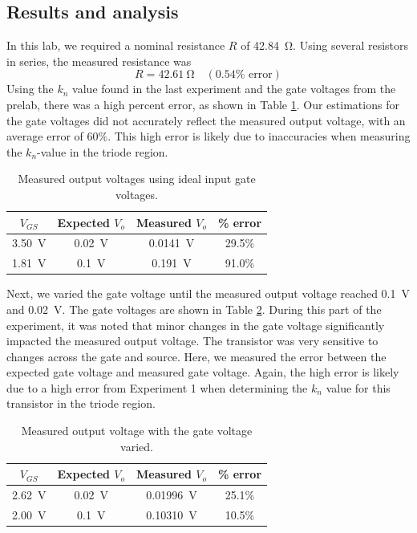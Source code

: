 \documentclass{report}
\begin{document}
\subsection{Results and analysis}
In this lab, we required a nominal resistance $R$ of \SI{42.84}{\ohm}. Using several resistors in series, the measured resistance was
\[ R = \SI{42.61}{\ohm} \quad (0.54\% \text{ error})\]
Using the $k_n$ value found in the last experiment and the gate voltages from the prelab, there was a high percent error, as shown in Table \ref{table:exp2values}. Our estimations for the gate voltages did not accurately reflect the measured output voltage, with an average error of 60\%. This high error is likely due to inaccuracies when measuring the $k_n$-value in the triode region. 
\begin{table}[H]
	\centering
	\caption{Measured output voltages using ideal input gate voltages.}
	\label{table:exp2values}
	\begin{threeparttable}
		\begin{tabular}{cccc}
			\toprule
			$V_{GS}$& Expected $V_o$ & Measured $V_o$ & \% error \\
			\midrule
			\SI{3.50}{\V} & \SI{0.02}{\V} & \SI{0.0141}{\V} & 29.5\% \\
			\SI{1.81}{\V} & \SI{0.1}{\V} & \SI{0.191}{\V} & 91.0\% \\
			\bottomrule
		\end{tabular}
	\end{threeparttable}
\end{table}
Next, we varied the gate voltage until the measured output voltage reached \SI{0.1}{\V} and \SI{0.02}{\V}. The gate voltages are shown in Table \ref{table:exp2varied}. During this part of the experiment, it was noted that minor changes in the gate voltage significantly impacted the measured output voltage. The transistor was very sensitive to changes across the gate and source. Here, we measured the error between the expected gate voltage and measured gate voltage. Again, the high error is likely due to a high error from Experiment 1 when determining the $k_n$ value for this transistor in the triode region.
\begin{table}[H]
	\centering
	\caption{Measured output voltage with the gate voltage varied.}
	\label{table:exp2varied}
	\begin{threeparttable}
		\begin{tabular}{cccc}
			\toprule
			$V_{GS}$& Expected $V_o$ & Measured $V_o$ & \% error \\
			\midrule
			\SI{2.62}{\V} & \SI{0.02}{\V} & \SI{0.01996}{\V} & 25.1\% \\
			\SI{2.00}{\V} & \SI{0.1}{\V} & \SI{0.10310}{\V} & 10.5\% \\
			\bottomrule
		\end{tabular}
	\end{threeparttable}
\end{table}
\end{document}
